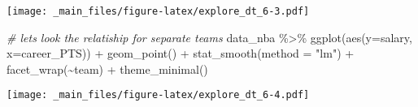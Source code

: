 \documentclass[
]{book}
\newenvironment{Shaded}{\begin{snugshade}}{\end{snugshade}}
\newcommand{\AttributeTok}[1]{\textcolor[rgb]{0.77,0.63,0.00}{#1}}
\newcommand{\CommentTok}[1]{\textcolor[rgb]{0.56,0.35,0.01}{\textit{#1}}}
\newcommand{\FunctionTok}[1]{\textcolor[rgb]{0.00,0.00,0.00}{#1}}
\newcommand{\NormalTok}[1]{#1}
\newcommand{\SpecialCharTok}[1]{\textcolor[rgb]{0.00,0.00,0.00}{#1}}
\newcommand{\StringTok}[1]{\textcolor[rgb]{0.31,0.60,0.02}{#1}}
\begin{document}
\texttt{[image: \_main\_files/figure-latex/explore\_dt\_6-3.pdf]}

\begin{Shaded}
\begin{Highlighting}[]
\CommentTok{\# let\textquotesingle{}s look the relatiship for separate teams}
\NormalTok{data\_nba }\SpecialCharTok{\%\textgreater{}\%} 
  \FunctionTok{ggplot}\NormalTok{(}\FunctionTok{aes}\NormalTok{(}\AttributeTok{y=}\NormalTok{salary, }\AttributeTok{x=}\NormalTok{career\_PTS)) }\SpecialCharTok{+}
    \FunctionTok{geom\_point}\NormalTok{() }\SpecialCharTok{+} 
     \FunctionTok{stat\_smooth}\NormalTok{(}\AttributeTok{method =} \StringTok{"lm"}\NormalTok{) }\SpecialCharTok{+} 
        \FunctionTok{facet\_wrap}\NormalTok{(}\SpecialCharTok{\textasciitilde{}}\NormalTok{team) }\SpecialCharTok{+} 
       \FunctionTok{theme\_minimal}\NormalTok{()}
\end{Highlighting}
\end{Shaded}

\texttt{[image: \_main\_files/figure-latex/explore\_dt\_6-4.pdf]}
\end{document}
